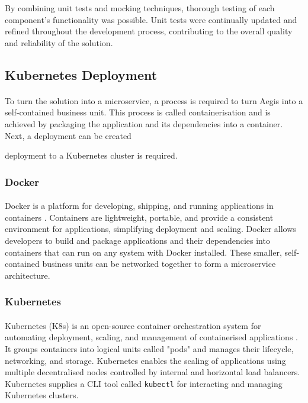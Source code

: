 \documentclass[12pt, conference, final, a4paper, onecolumn, compsoc]{IEEEtran}
\begin{document}
By combining unit tests and mocking techniques, thorough testing of each
component's functionality was possible. Unit tests were continually updated and
refined throughout the development process, contributing to the overall quality
and reliability of the solution.

\subsection{Kubernetes Deployment}
\paragraph{}

To turn the solution into a microservice, a process is required to turn Aegis
into a self-contained business unit. This process is called containerisation and
is achieved by packaging the application and its dependencies into a container.
Next, a deployment can be created


deployment to a Kubernetes cluster is
required.

\subsubsection*{Docker}
\paragraph{}
Docker is a platform for developing, shipping, and running
applications in containers \citep{docker}. Containers are lightweight, portable,
and provide a consistent environment for applications, simplifying deployment
and scaling. Docker allows developers to build and package applications and
their dependencies into containers that can run on any system with Docker
installed. These smaller, self-contained business units can be networked
together to form a microservice architecture.

\subsubsection*{Kubernetes}
\paragraph{}
Kubernetes (K8s) is an open-source container orchestration system
for automating deployment, scaling, and management of containerised applications
\citep{k8s-docs}. It groups containers into logical units called "pods" and
manages their lifecycle, networking, and storage. Kubernetes enables the scaling
of applications using multiple decentralised nodes controlled by internal and
horizontal load balancers. Kubernetes supplies a CLI tool called
\texttt{kubectl} for interacting and managing Kubernetes clusters.
\end{document}

